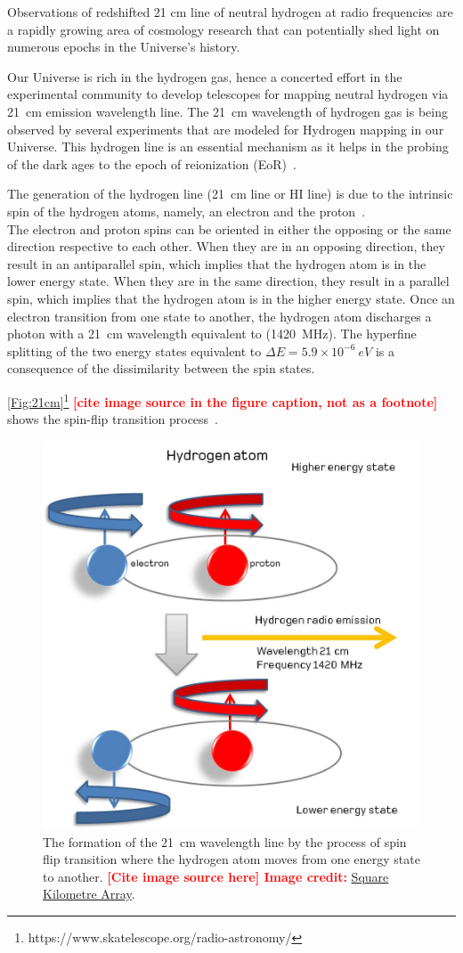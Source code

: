 \documentclass[12pt,a4paper]{report}
\newcommand{\attention}[1]{\textcolor{red}{\bf {#1}}}
\begin{document}
	
	Observations of redshifted 21 cm line of neutral hydrogen at radio frequencies are a rapidly growing area of cosmology research that can potentially shed light on numerous epochs in the Universe's history.

	Our Universe is rich in the hydrogen gas, hence a
	concerted effort in the experimental community to develop telescopes for mapping neutral hydrogen via \SI{21}{cm} emission wavelength line. The \SI{21}{cm} wavelength of hydrogen gas is being observed by several experiments that are modeled for Hydrogen mapping in our Universe. This hydrogen line is an essential mechanism as it helps in the probing of the dark ages to the epoch of reionization (EoR)~\citep{2013PhRvD..87d3002L,2014ApJ...782...66P}.
	
	The generation of the hydrogen line (\SI{21}{cm} line or HI line) is due to the intrinsic spin of the hydrogen atoms, namely, an electron and the proton~\citep{book:832129}.\\
	
	The electron and proton spins can be oriented in either the opposing or the same direction respective to each other. When they are in an opposing direction, they result in an antiparallel spin, which implies that the hydrogen atom is in the lower energy state. When they are in the same direction, they result in a parallel spin, which implies that the hydrogen atom is in the higher energy state. Once an electron transition from one state to another, the hydrogen atom discharges a photon with a \SI{21}{cm} wavelength equivalent to (\SI{1420}{MHz}). The hyperfine splitting of the two energy states equivalent to \(\Delta E =  5.9 \times 10^{-6} \ eV\) is a consequence of the dissimilarity between the spin states.
		
	\autoref{Fig:21cm}\footnote{https://www.skatelescope.org/radio-astronomy/} \attention{[cite image source in the figure caption, not as a footnote]} shows the spin-flip transition process~\citep{16, book:832129}.
	
	\begin{figure}[htb!]
		\begin{center}
			\includegraphics[width=0.5\linewidth]{Figures/Hydrogenemission1.jpeg}
			\caption{The formation of the \SI{21}{cm} wavelength line by the process of spin flip transition where the hydrogen atom moves from one energy state to another. \attention{[Cite image source here] Image credit:} \href{https://www.skatelescope.org/radio-astronomy/}{Square Kilometre Array}.}
			\label{Fig:21cm}
		\end{center}
	\end{figure}
	
\end{document}
